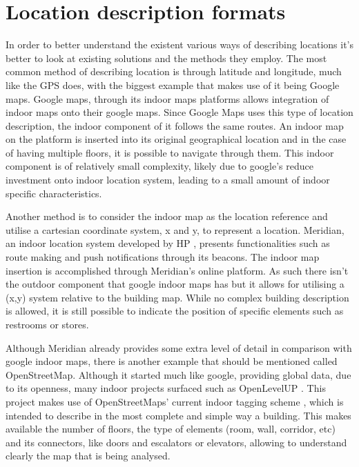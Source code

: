 \section{Location description formats} 
\label{sec:description} 
 
 
In order to better understand the existent various ways of describing locations it's better to look at existing solutions and the methods they employ. The most common method of describing location is through latitude and longitude, much like the \ac{GPS} does, with the biggest example that makes use of it being Google maps. Google maps, through its indoor maps platforms \cite{googlemaps} allows integration of indoor maps onto their google maps. Since Google Maps uses this type of location description, the indoor component of it follows the same routes. An indoor map on the platform is inserted into its original geographical location and in the case of having multiple floors, it is possible to navigate through them. This indoor component is of relatively small complexity, likely due to google's reduce investment onto indoor location system, leading to a small amount of indoor specific characteristics.  
 
 
Another method is to consider the indoor map as the location reference and utilise a cartesian coordinate system, x and y, to represent a location. Meridian, an indoor location system developed by HP \cite{meridian}, presents functionalities such as route making and push notifications through its beacons. The indoor map insertion is accomplished through Meridian's online platform. As such there isn't the outdoor component that google indoor maps has but it allows for utilising a (x,y) system relative to the building map. While no complex building description is allowed, it is still possible to indicate the position of specific elements such as restrooms or stores. 
 
 
Although Meridian already provides some extra level of detail in comparison with google indoor maps, there is another example that should be mentioned called OpenStreetMap. Although it started much like google, providing global data, due to its openness, many indoor projects surfaced such as OpenLevelUP \cite{openlevel}. This project makes use of OpenStreetMaps' current indoor tagging scheme \cite{opentagging}, which is intended to describe in the most complete and simple way a building. This makes available the number of floors, the type of elements (room, wall, corridor, etc) and its connectors, like doors and escalators or elevators, allowing to understand clearly the map that is being analysed. 
 
 
 